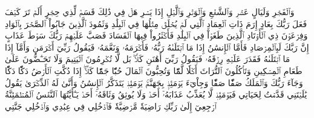 وَٱلۡفَجۡرِ
وَلَيَالٍ عَشۡرٖ
وَٱلشَّفۡعِ وَٱلۡوَتۡرِ
وَٱلَّيۡلِ إِذَا يَسۡرِ
هَلۡ فِي ذَٰلِكَ قَسَمٞ لِّذِي حِجۡرٍ
أَلَمۡ تَرَ كَيۡفَ فَعَلَ رَبُّكَ بِعَادٍ
إِرَمَ ذَاتِ ٱلۡعِمَادِ
ٱلَّتِي لَمۡ يُخۡلَقۡ مِثۡلُهَا فِي ٱلۡبِلَٰدِ
وَثَمُودَ ٱلَّذِينَ جَابُواْ ٱلصَّخۡرَ بِٱلۡوَادِ
وَفِرۡعَوۡنَ ذِي ٱلۡأَوۡتَادِ
ٱلَّذِينَ طَغَوۡاْ فِي ٱلۡبِلَٰدِ
فَأَكۡثَرُواْ فِيهَا ٱلۡفَسَادَ
فَصَبَّ عَلَيۡهِمۡ رَبُّكَ سَوۡطَ عَذَابٍ
إِنَّ رَبَّكَ لَبِٱلۡمِرۡصَادِ
فَأَمَّا ٱلۡإِنسَٰنُ إِذَا مَا ٱبۡتَلَىٰهُ رَبُّهُۥ فَأَكۡرَمَهُۥ وَنَعَّمَهُۥ فَيَقُولُ رَبِّيٓ أَكۡرَمَنِ
وَأَمَّآ إِذَا مَا ٱبۡتَلَىٰهُ فَقَدَرَ عَلَيۡهِ رِزۡقَهُۥ فَيَقُولُ رَبِّيٓ أَهَٰنَنِ
كَلَّاۖ بَل لَّا تُكۡرِمُونَ ٱلۡيَتِيمَ
وَلَا تَحَـٰٓضُّونَ عَلَىٰ طَعَامِ ٱلۡمِسۡكِينِ
وَتَأۡكُلُونَ ٱلتُّرَاثَ أَكۡلٗا لَّمّٗا
وَتُحِبُّونَ ٱلۡمَالَ حُبّٗا جَمّٗا
كَلَّآۖ إِذَا دُكَّتِ ٱلۡأَرۡضُ دَكّٗا دَكّٗا
وَجَآءَ رَبُّكَ وَٱلۡمَلَكُ صَفّٗا صَفّٗا
وَجِاْيٓءَ يَوۡمَئِذِۭ بِجَهَنَّمَۚ يَوۡمَئِذٖ يَتَذَكَّرُ ٱلۡإِنسَٰنُ وَأَنَّىٰ لَهُ ٱلذِّكۡرَىٰ
يَقُولُ يَٰلَيۡتَنِي قَدَّمۡتُ لِحَيَاتِي
فَيَوۡمَئِذٖ لَّا يُعَذِّبُ عَذَابَهُۥٓ أَحَدٞ
وَلَا يُوثِقُ وَثَاقَهُۥٓ أَحَدٞ
يَـٰٓأَيَّتُهَا ٱلنَّفۡسُ ٱلۡمُطۡمَئِنَّةُ
ٱرۡجِعِيٓ إِلَىٰ رَبِّكِ رَاضِيَةٗ مَّرۡضِيَّةٗ
فَٱدۡخُلِي فِي عِبَٰدِي
وَٱدۡخُلِي جَنَّتِي
